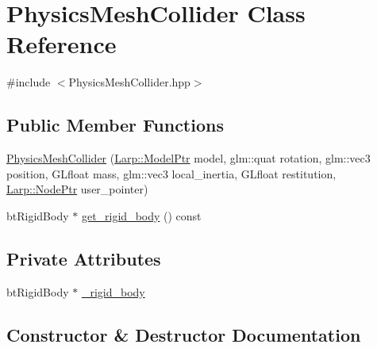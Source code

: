 \hypertarget{classPhysicsMeshCollider}{}\section{Physics\+Mesh\+Collider Class Reference}
\label{classPhysicsMeshCollider}


{\ttfamily \#include $<$Physics\+Mesh\+Collider.\+hpp$>$}

\subsection*{Public Member Functions}
\begin{DoxyCompactItemize}
\item 
\hyperlink{classPhysicsMeshCollider_a01693b5b41b6bce02cab01cab3ebb9d5}{Physics\+Mesh\+Collider} (\hyperlink{namespaceLarp_a1fbc1dec59f7a571dc06e152b1e7d38c}{Larp\+::\+Model\+Ptr} model, glm\+::quat rotation, glm\+::vec3 position, G\+Lfloat mass, glm\+::vec3 local\+\_\+inertia, G\+Lfloat restitution, \hyperlink{namespaceLarp_a171c1dc8b70cfb441b15d7386780db23}{Larp\+::\+Node\+Ptr} user\+\_\+pointer)
\item 
bt\+Rigid\+Body $\ast$ \hyperlink{classPhysicsMeshCollider_a2518cb2798d507046a1f8e356f8a6f56}{get\+\_\+rigid\+\_\+body} () const 
\end{DoxyCompactItemize}
\subsection*{Private Attributes}
\begin{DoxyCompactItemize}
\item 
bt\+Rigid\+Body $\ast$ \hyperlink{classPhysicsMeshCollider_a79bf728a386ac89b63c4ded82af6762b}{\+\_\+rigid\+\_\+body}
\end{DoxyCompactItemize}


\subsection{Constructor \& Destructor Documentation}
